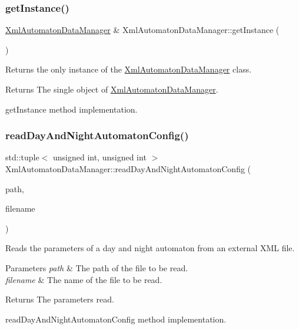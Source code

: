 \subsubsection{\texorpdfstring{get\+Instance()}{getInstance()}}
{\footnotesize\ttfamily \mbox{\hyperlink{class_xml_automaton_data_manager}{Xml\+Automaton\+Data\+Manager}} \& Xml\+Automaton\+Data\+Manager\+::get\+Instance (\begin{DoxyParamCaption}{ }\end{DoxyParamCaption})\hspace{0.3cm}{\ttfamily [static]}}

Returns the only instance of the \mbox{\hyperlink{class_xml_automaton_data_manager}{Xml\+Automaton\+Data\+Manager}} class.

\begin{DoxyReturn}{Returns}
The single object of \mbox{\hyperlink{class_xml_automaton_data_manager}{Xml\+Automaton\+Data\+Manager}}.
\end{DoxyReturn}
get\+Instance method implementation. \mbox{\label{class_xml_automaton_data_manager_a1ae0eceb9259b11a80fc62e9f694773a}} 
\subsubsection{\texorpdfstring{read\+Day\+And\+Night\+Automaton\+Config()}{readDayAndNightAutomatonConfig()}}
{\footnotesize\ttfamily std\+::tuple$<$ unsigned int, unsigned int $>$ Xml\+Automaton\+Data\+Manager\+::read\+Day\+And\+Night\+Automaton\+Config (\begin{DoxyParamCaption}\item[{Q\+String}]{path,  }\item[{Q\+String}]{filename }\end{DoxyParamCaption})}

Reads the parameters of a day and night automaton from an external X\+ML file.


\begin{DoxyParams}{Parameters}
{\em path} & The path of the file to be read. \\
\hline
{\em filename} & The name of the file to be read. \\
\hline
\end{DoxyParams}
\begin{DoxyReturn}{Returns}
The parameters read.
\end{DoxyReturn}
read\+Day\+And\+Night\+Automaton\+Config method implementation. \mbox{\label{class_xml_automaton_data_manager_a1bfbd91aa176a1b18ee87630eec9929d}} 
